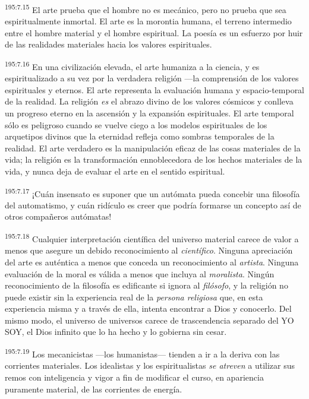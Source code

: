 \par
\textsuperscript{195:7.15} El arte prueba que el hombre no es mecánico, pero no prueba que sea espiritualmente inmortal. El arte es la morontia humana, el terreno intermedio entre el hombre material y el hombre espiritual. La poesía es un esfuerzo por huir de las realidades materiales hacia los valores espirituales.

\par
\textsuperscript{195:7.16} En una civilización elevada, el arte humaniza a la ciencia, y es espiritualizado a su vez por la verdadera religión ---la comprensión de los valores espirituales y eternos. El arte representa la evaluación humana y espacio-temporal de la realidad. La religión \textit{es} el abrazo divino de los valores cósmicos y conlleva un progreso eterno en la ascensión y la expansión espirituales. El arte temporal sólo es peligroso cuando se vuelve ciego a los modelos espirituales de los arquetipos divinos que la eternidad refleja como sombras temporales de la realidad. El arte verdadero es la manipulación eficaz de las cosas materiales de la vida; la religión es la transformación ennoblecedora de los hechos materiales de la vida, y nunca deja de evaluar el arte en el sentido espiritual.

\par
\textsuperscript{195:7.17} ¡Cuán insensato es suponer que un autómata pueda concebir una filosofía del automatismo, y cuán ridículo es creer que podría formarse un concepto así de otros compañeros autómatas!

\par
\textsuperscript{195:7.18} Cualquier interpretación científica del universo material carece de valor a menos que asegure un debido reconocimiento al \textit{científico}. Ninguna apreciación del arte es auténtica a menos que conceda un reconocimiento al \textit{artista}. Ninguna evaluación de la moral es válida a menos que incluya al \textit{moralista}. Ningún reconocimiento de la filosofía es edificante si ignora al \textit{filósofo}, y la religión no puede existir sin la experiencia real de la \textit{persona religiosa} que, en esta experiencia misma y a través de ella, intenta encontrar a Dios y conocerlo. Del mismo modo, el universo de universos carece de trascendencia separado del YO SOY, el Dios infinito que lo ha hecho y lo gobierna sin cesar.

\par
\textsuperscript{195:7.19} Los mecanicistas ---los humanistas--- tienden a ir a la deriva con las corrientes materiales. Los idealistas y los espiritualistas \textit{se atreven} a utilizar sus remos con inteligencia y vigor a fin de modificar el curso, en apariencia puramente material, de las corrientes de energía.

